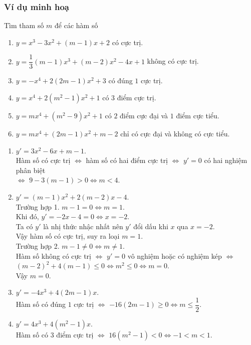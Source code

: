 \subsubsection{Ví dụ minh hoạ}
\begin{vd}%
	Tìm tham số $m$ để các hàm số
\begin{enumerate}
	\item[a)] $y=x^3-3x^2+(m-1)x+2$ có cực trị.
	\item[b)] $y=\dfrac{1}{3}(m-1)x^3+(m-2)x^2-4x+1$ không có cực trị.
	\item[c)] $y=-x^4+2(2m-1)x^2+3$ có đúng $1$ cực trị.
	\item[d)] $y=x^4+2\left(m^2-1\right)x^2+1$ có $3$ điểm cực trị.
	\item[e)] $y=mx^4+\left(m^2-9\right)x^2+1$ có $2$ điểm cực đại và $1$ điểm cực tiểu.
	\item[f)] $y=mx^4+(2m-1)x^2+m-2$ chỉ có cực đại và không có cực tiểu.
\end{enumerate}
\loigiai
{
\begin{enumerate}
	\item[a)] $y'=3x^2-6x+m-1$.\\
Hàm số có cực trị $\Leftrightarrow$ hàm số có hai điểm cực trị $\Leftrightarrow$ $y'=0$ có hai nghiệm phân biệt \\
$\Leftrightarrow$ $9-3(m-1)>0\Leftrightarrow m<4$.
\item[b)] $y'=(m-1)x^2+2(m-2)x-4$.\\
Trường hợp 1. $m-1=0\Leftrightarrow m=1$. \\
Khi đó, $y'=-2x-4=0\Leftrightarrow x=-2$.\\
Ta có $y'$ là nhị thức nhậc nhất nên $y'$ đổi dấu khi $x$ qua $x=-2$.\\
Vậy hàm số có cực trị, suy ra loại $m=1$.\\
Trường hợp 2. $m-1\neq0\Leftrightarrow m\neq1$. \\
Hàm số không có cực trị $\Leftrightarrow$ $y'=0$ vô nghiệm hoặc có nghiệm kép $\Leftrightarrow$ $\left(m-2\right)^2+4(m-1)\leq0\Leftrightarrow m^2\leq0\Leftrightarrow m=0$.\\
Vậy $m=0$.
\item[c)] $y'=-4x^3+4(2m-1)x$. \\
Hàm số có đúng $1$ cực trị $\Leftrightarrow$ $-16(2m-1)\geq0\Leftrightarrow m\leq\dfrac{1}{2}$.
\item[d)] $y'=4x^3+4\left(m^2-1\right)x$. \\
Hàm số có $3$ điểm cực trị $\Leftrightarrow$ $16\left(m^2-1\right)<0\Leftrightarrow -1<m<1$.

\end{enumerate}}
\end{vd}
